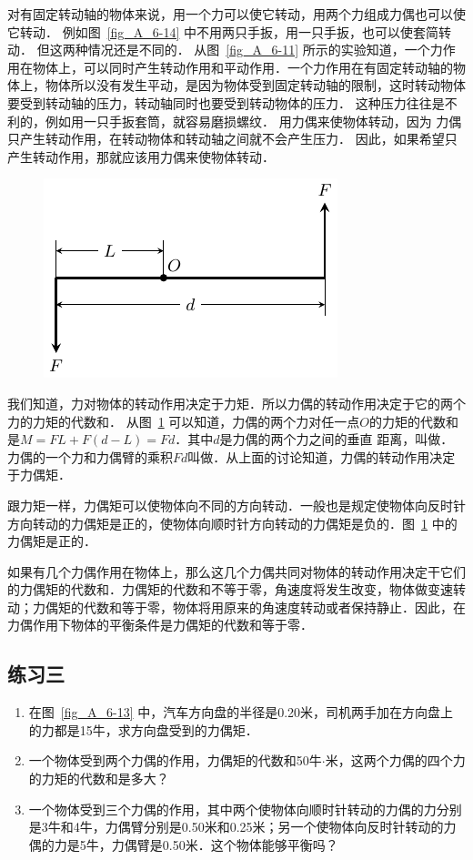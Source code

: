 对有固定转动轴的物体来说，用一个力可以使它转动，用两个力组成力偶也可以使它转动．
例如图~\ref{fig_A_6-14} 中不用两只手扳，用一只手扳，也可以使套简转动．
但这两种情况还是不同的．
从图~\ref{fig_A_6-11} 所示的实验知道，一个力作用在物体上，可以同时产生转动作用和平动作用．一个力作用在有固定转动轴的物体上，物体所以没有发生平动，是因为物体受到固定转动轴的限制，这时转动物体要受到转动轴的压力，转动轴同时也要受到转动物体的压力．
这种压力往往是不利的，例如用一只手扳套筒，就容易磨损螺纹．
用力偶来使物体转动，因为
力偶只产生转动作用，在转动物体和转动轴之间就不会产生压力．
因此，如果希望只产生转动作用，那就应该用力偶来使物体转动．
\begin{figure}[htbp]
    \centering
    \includegraphics{fig/A/6-15.pdf}
    \caption{}\label{fig_A_6-15}
\end{figure}

我们知道，力对物体的转动作用决定于力矩．所以力偶的转动作用决定于它的两个力的力矩的代数和．
从图~\ref{fig_A_6-15} 可以知道，力偶的两个力对任一点$O$的力矩的代数和是$M=FL+F(d-L)=Fd$．其中$d$是力偶的两个力之间的垂直
距离，叫做．力偶的一个力和力偶臂的乘积$Fd$叫做．从上面的讨论知道，力偶的转动作用决定于力偶矩．

跟力矩一样，力偶矩可以使物体向不同的方向转动．一般也是规定使物体向反时针方向转动的力偶矩是正的，使物体向顺时针方向转动的力偶矩是负的．图~\ref{fig_A_6-15} 中的力偶矩是正的．




如果有几个力偶作用在物体上，那么这几个力偶共同对物体的转动作用决定干它们的力偶矩的代数和．力偶矩的代数和不等于零，角速度将发生改变，物体做变速转动；力偶矩的代数和等于零，物体将用原来的角速度转动或者保持静止．因此，在力偶作用下物体的平衡条件是力偶矩的代数和等于零．

\subsection*{练习三}
\begin{enumerate}
    \item 在图~\ref{fig_A_6-13} 中，汽车方向盘的半径是0.20米，司机两手加在方向盘上的力都是15牛，求方向盘受到的力偶矩．
    \item 一个物体受到两个力偶的作用，力偶矩的代数和50牛$\cdot$米，这两个力偶的四个力的力矩的代数和是多大？
    \item 一个物体受到三个力偶的作用，其中两个使物体向顺时针转动的力偶的力分别是3牛和4牛，力偶臂分别是0.50米和0.25米；另一个使物体向反时针转动的力偶的力是5牛，力偶臂是0.50米．这个物体能够平衡吗？
\end{enumerate}

